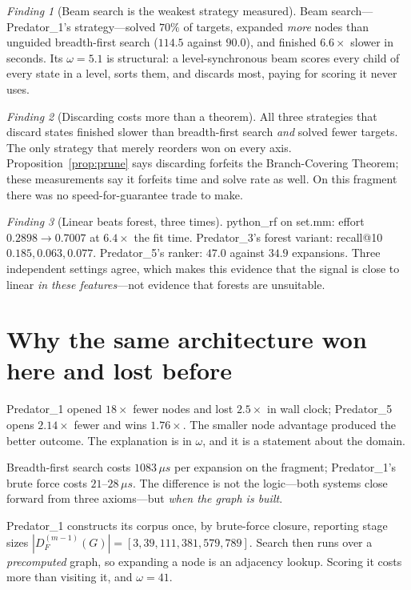 \documentclass[11pt]{article}
\theoremstyle{plain}
\theoremstyle{definition}
\theoremstyle{remark}
\newtheorem{finding}{Finding}
\begin{document}
\begin{finding}[Beam search is the weakest strategy measured]
Beam search---Predator\_1's strategy---solved $70\%$ of targets, expanded
\emph{more} nodes than unguided breadth-first search ($114.5$ against $90.0$),
and finished $6.6\times$ slower in seconds. Its $\omega = 5.1$ is structural: a
level-synchronous beam scores every child of every state in a level, sorts them,
and discards most, paying for scoring it never uses.
\end{finding}

\begin{finding}[Discarding costs more than a theorem]
All three strategies that discard states finished slower than breadth-first
search \emph{and} solved fewer targets. The only strategy that merely reorders
won on every axis. Proposition~\ref{prop:prune} says discarding forfeits the
Branch-Covering Theorem; these measurements say it forfeits time and solve rate
as well. On this fragment there was no speed-for-guarantee trade to make.
\end{finding}

\begin{finding}[Linear beats forest, three times]
python\_rf on set.mm: effort $0.2898 \to 0.7007$ at $6.4\times$ the fit time.
Predator\_3's forest variant: recall@10 $0.185, 0.063, 0.077$. Predator\_5's
ranker: $47.0$ against $34.9$ expansions. Three independent settings agree,
which makes this evidence that the signal is close to linear \emph{in these
features}---not evidence that forests are unsuitable.
\end{finding}

\section{Why the same architecture won here and lost before}

Predator\_1 opened $18\times$ fewer nodes and lost $2.5\times$ in wall clock;
Predator\_5 opens $2.14\times$ fewer and wins $1.76\times$. The smaller node
advantage produced the better outcome. The explanation is in $\omega$, and it is
a statement about the domain.

Breadth-first search costs $1083\,\mu s$ per expansion on the fragment;
Predator\_1's brute force costs $21$--$28\,\mu s$. The difference is not the
logic---both systems close forward from three axioms---but \emph{when the graph
is built}.

Predator\_1 constructs its corpus once, by brute-force closure, reporting stage
sizes $|D_F^{(m-1)}(G)| = [3, 39, 111, 381, 579, 789]$. Search then runs over a
\emph{precomputed} graph, so expanding a node is an adjacency lookup. Scoring it
costs more than visiting it, and $\omega = 41$.
\end{document}
